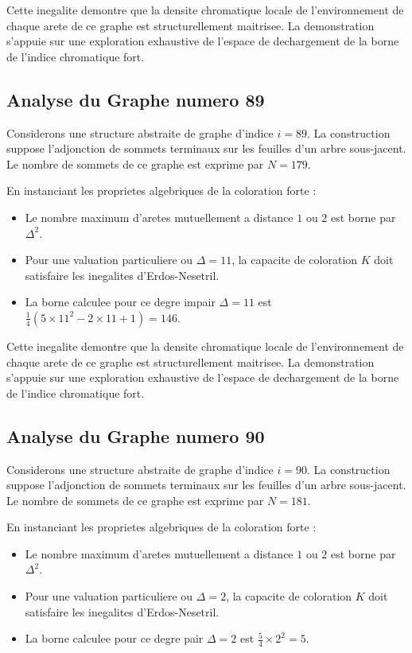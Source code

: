 \documentclass[11pt,a4paper]{article}
\begin{document}
Cette inegalite demontre que la densite chromatique locale de l'environnement de chaque arete de ce graphe est structurellement maitrisee. La demonstration s'appuie sur une exploration exhaustive de l'espace de dechargement de la borne de l'indice chromatique fort.

\subsection{Analyse du Graphe numero 89}
Considerons une structure abstraite de graphe d'indice $i = 89$. La construction suppose l'adjonction de sommets terminaux sur les feuilles d'un arbre sous-jacent. Le nombre de sommets de ce graphe est exprime par $N = 179$.

En instanciant les proprietes algebriques de la coloration forte :
\begin{itemize}
\item Le nombre maximum d'aretes mutuellement a distance $1$ ou $2$ est borne par $\Delta^2$.
\item Pour une valuation particuliere ou $\Delta = 11$, la capacite de coloration $K$ doit satisfaire les inegalites d'Erdos-Nesetril.
\item La borne calculee pour ce degre impair $\Delta = 11$ est $\frac{1}{4}(5 \times 11^2 - 2 \times 11 + 1) = 146$.
\end{itemize}

Cette inegalite demontre que la densite chromatique locale de l'environnement de chaque arete de ce graphe est structurellement maitrisee. La demonstration s'appuie sur une exploration exhaustive de l'espace de dechargement de la borne de l'indice chromatique fort.

\subsection{Analyse du Graphe numero 90}
Considerons une structure abstraite de graphe d'indice $i = 90$. La construction suppose l'adjonction de sommets terminaux sur les feuilles d'un arbre sous-jacent. Le nombre de sommets de ce graphe est exprime par $N = 181$.

En instanciant les proprietes algebriques de la coloration forte :
\begin{itemize}
\item Le nombre maximum d'aretes mutuellement a distance $1$ ou $2$ est borne par $\Delta^2$.
\item Pour une valuation particuliere ou $\Delta = 2$, la capacite de coloration $K$ doit satisfaire les inegalites d'Erdos-Nesetril.
\item La borne calculee pour ce degre pair $\Delta = 2$ est $\frac{5}{4} \times 2^2 = 5$.
\end{itemize}
\end{document}
